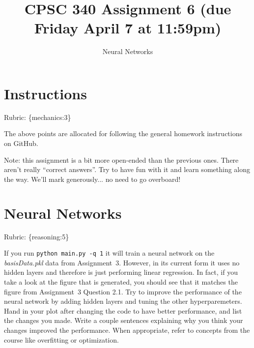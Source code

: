 \documentclass{article}
\begin{document}
\def\blu#1{{\color{blu}#1}}
\def\gre#1{{\color{gre}#1}}
\def\red#1{{\color{red}#1}}
\def\norm#1{\|#1\|}
\newcommand{\argmin}[1]{\mathop{\hbox{argmin}}_{#1}}
\newcommand{\argmax}[1]{\mathop{\hbox{argmax}}_{#1}}
\def\R{\mathbb{R}}
\newcommand{\fig}[2]{\texttt{[image: \#2]}}
\newcommand{\centerfig}[2]{\begin{center}\texttt{[image: \#2]}\end{center}}
\def\items#1{\begin{itemize}#1\end{itemize}}
\def\enum#1{\begin{enumerate}#1\end{enumerate}}
\def\answer#1{\iftoggle{answers}{\blu{Answer}:\\#1}}
\newcommand{\code}[1]{}
\newcommand{\half}{\frac 1 2}
\def\argmax{\mathop{\rm arg\,max}}
\def\argmin{\mathop{\rm arg\,min}}
\def\rubric#1{\gre{Rubric: \{#1\}}}{}


\title{CPSC 340 Assignment 6 (due Friday April 7 at 11:59pm)}
\author{Neural Networks}
\date{}
\maketitle


\section*{Instructions}
\rubric{mechanics:3}

The above points are allocated for following the general homework instructions on GitHub.

\vspace{1em}

Note: this assignment is a bit more open-ended than the previous ones. There aren't really ``correct answers''. 
Try to have fun with it and learn something along the way. We'll mark generously... no need to go overboard!

\section{Neural Networks}
\rubric{reasoning:5}

If you run \texttt{python main.py -q 1} it will train a neural network on the \emph{basisData.pkl} data from Assignment~3. 
However, in its current form it uses no hidden layers and therefore is just performing linear regression.
In fact, if you take a look at the figure that is generated, you should see that it matches the figure
from Assignment~3 Question 2.1. 
Try to improve the performance of the neural network by adding hidden layers and tuning the other hyperparemeters. 
\blu{Hand in your plot after changing the code to have better performance, and list the changes you made. Write a couple sentences
explaining why you think your changes improved the performance. When appropriate, refer to concepts from the course like overfitting
or optimization.}
\end{document}
